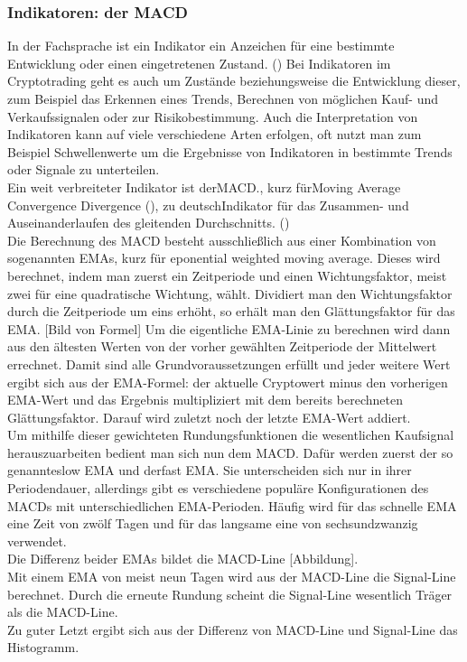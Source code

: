 \documentclass[12pt]{article}
\begin{document}
	\subsubsection{Indikatoren: der MACD}
		In der Fachsprache ist ein Indikator ein Anzeichen für eine bestimmte Entwicklung oder einen eingetretenen Zustand. (\cite{OxfordLanguageIndicator}) Bei Indikatoren im Cryptotrading geht es auch um Zustände beziehungsweise die Entwicklung dieser, zum Beispiel das Erkennen eines Trends, Berechnen von möglichen Kauf- und Verkaufssignalen oder zur Risikobestimmung. Auch die Interpretation von Indikatoren kann auf viele verschiedene Arten erfolgen, oft nutzt man zum Beispiel Schwellenwerte um die Ergebnisse von Indikatoren in bestimmte Trends oder Signale zu unterteilen.\\
		Ein weit verbreiteter Indikator ist der\glqq MACD.\grqq{}, kurz für\glqq Moving Average Convergence Divergence\grqq{} (\cite{investopediaMACD}), zu deutsch\glqq Indikator für das Zusammen- und Auseinanderlaufen des gleitenden Durchschnitts.\grqq{} (\cite{wikipediaMACDDeutsch})\\ Die Berechnung des MACD besteht ausschließlich aus einer Kombination von sogenannten \glqq EMAs\grqq{}, kurz für \glqq eponential weighted moving average\grqq{}. Dieses wird berechnet, indem man zuerst ein Zeitperiode und einen Wichtungsfaktor, meist zwei für eine quadratische Wichtung, wählt. Dividiert man den Wichtungsfaktor durch die Zeitperiode um eins erhöht, so erhält man den Glättungsfaktor für das EMA. [Bild von Formel] Um die eigentliche EMA-Linie zu berechnen wird dann aus den ältesten Werten von der vorher gewählten Zeitperiode der Mittelwert errechnet. Damit sind alle Grundvoraussetzungen erfüllt und jeder weitere Wert ergibt sich aus der EMA-Formel: der aktuelle Cryptowert minus den vorherigen EMA-Wert und das Ergebnis multipliziert mit dem bereits berechneten Glättungsfaktor. Darauf wird zuletzt noch der letzte EMA-Wert addiert.\\
		Um mithilfe dieser gewichteten Rundungsfunktionen die wesentlichen Kaufsignal herauszuarbeiten bedient man sich nun dem MACD. Dafür werden zuerst der so genannte\glqq slow EMA\grqq{} und der\glqq fast EMA\grqq{}. Sie unterscheiden sich nur in ihrer Periodendauer, allerdings gibt es verschiedene populäre Konfigurationen des MACDs mit unterschiedlichen EMA-Perioden. Häufig wird für das schnelle EMA eine Zeit von zwölf Tagen und für das langsame eine von sechsundzwanzig verwendet.\\
		Die Differenz beider EMAs bildet die MACD-Line [Abbildung].\\
		Mit einem EMA von meist neun Tagen wird aus der MACD-Line die Signal-Line berechnet. Durch die erneute Rundung scheint die Signal-Line wesentlich Träger als die MACD-Line.\\
		Zu guter Letzt ergibt sich aus der Differenz von MACD-Line und Signal-Line das Histogramm.
\end{document}
